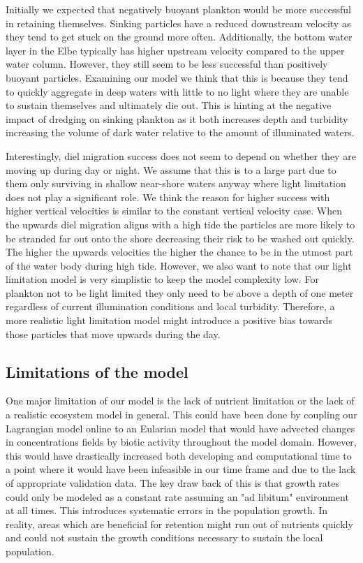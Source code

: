 \documentclass[npg, manuscript]{copernicus}
\begin{document}
Initially we expected that negatively buoyant plankton would be more successful in retaining themselves.
Sinking particles have a reduced downstream velocity as they tend to get stuck on the ground more often.
Additionally, the bottom water layer in the Elbe typically has higher upstream velocity compared to the upper water column.
However, they still seem to be less successful than positively buoyant particles.
Examining our model we think  that this is because they tend to quickly aggregate in deep waters with little to no light where they are unable to sustain themselves and ultimately die out.
This is hinting at the negative impact of dredging on sinking plankton as it both increases depth and turbidity increasing the volume of dark water relative to the amount of illuminated waters.

Interestingly, diel migration success does not seem to depend on whether they are moving up during day or night.
We assume that this is to a large part due to them only surviving in shallow near-shore waters anyway where light limitation does not play a significant role.
We think the reason for higher success with higher vertical velocities is similar to the constant vertical velocity case.
When the upwards diel migration aligns with a high tide the particles are more likely to be stranded far out onto the shore decreasing their risk to be washed out quickly.
The higher the upwards velocities the higher the chance to be in the utmost part of the water body during high tide.
However, we also want to note that our light limitation model is very simplistic to keep the model complexity low.
For plankton not to be light limited they only need to be above a depth of one meter regardless of current illumination conditions and local turbidity.
Therefore, a more realistic light limitation model might introduce a positive bias towards those particles that move upwards during the day.

\subsection{Limitations of the model}

One major limitation of our model is the lack of nutrient limitation or the lack of a realistic ecosystem model in general.
This could have been done by coupling our Lagrangian model online to an Eularian model that would have advected changes in concentrations fields by biotic activity throughout the model domain.
However, this would have drastically increased both developing and computational time to a point where it would have been infeasible in our time frame and due to the lack of appropriate validation data.
The key draw back of this is that growth rates could only be modeled as a constant rate assuming an "ad libitum" environment at all times.
This introduces systematic errors in the population growth. In reality, areas which are beneficial for retention might run out of nutrients quickly and could not sustain the growth conditions necessary to sustain the local population.
\end{document}
